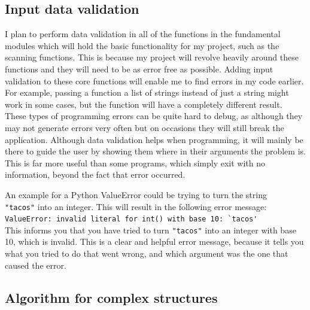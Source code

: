 \documentclass[titlepage]{article}
\let\Oldsubsection\subsection{}
\renewcommand{\subsection}{\FloatBarrier\Oldsubsection}
\begin{document}
\subsection{Input data validation}

I plan to perform data validation in all of the functions in the fundamental modules
which will hold the basic functionality for my project, such as the scanning functions.
This is because my project will revolve heavily around these functions and they
will need to be as error free as possible.
Adding input validation to these core functions will enable me to find
errors in my code earlier.
For example, passing a function a list of strings instead of just a string might work in some cases,
but the function will have a completely different result.
These types of programming errors can be quite hard to debug,
as although they may not generate errors very often but on occasions they will still break the application.
Although data validation helps when programming, it will mainly be there to guide the user by showing them where
in their arguments the problem is. This is far more useful than some programs, which simply exit with
no information, beyond the fact that error occurred.

An example for a Python ValueError could be trying to turn the string \\
\verb|"tacos"|
into an integer. This will result in the following error message:\\
\verb|ValueError: invalid literal for int() with base 10: `tacos'| \\
This informs you that you have tried to turn \verb|"tacos"|
into an integer with base 10, which is invalid.
This is a clear and helpful error message,
because it tells you what you tried to do that went wrong,
and which argument was the one that caused the error.

\subsection{Algorithm for complex structures}
\end{document}
